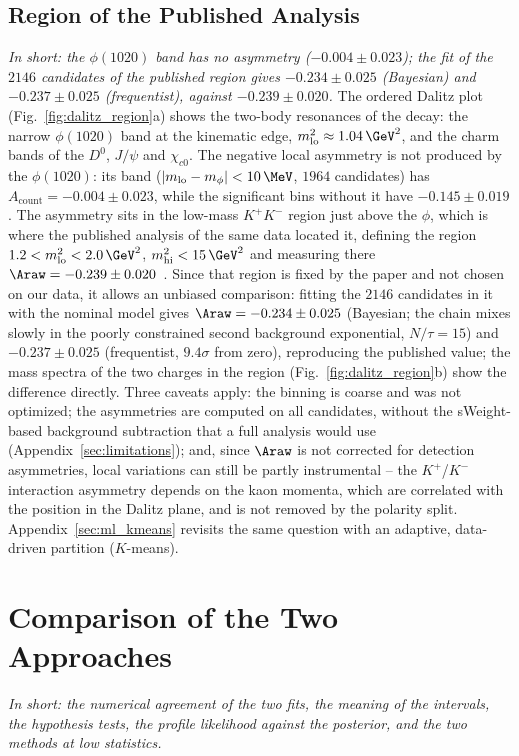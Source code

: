 \subsection{Region of the Published Analysis}
\emph{In short: the $\phi(1020)$ band has no asymmetry ($-0.004\pm0.023$); the fit of the $2146$ candidates of the published region gives $-0.234\pm0.025$ (Bayesian) and $-0.237\pm0.025$ (frequentist), against $-0.239\pm0.020$.}
The ordered Dalitz plot (Fig.~\ref{fig:dalitz_region}a) shows the two-body resonances of the decay: the narrow $\phi(1020)$ band at the kinematic edge, $m^2_{\mathrm{lo}}\approx1.04\,\GeV^2$, and the charm bands of the $D^0$, $J/\psi$ and $\chi_{c0}$. The negative local asymmetry is not produced by the $\phi(1020)$: its band ($|m_{\mathrm{lo}}-m_\phi|<10\,\MeV$, $1964$ candidates) has $A_{\mathrm{count}}=-0.004\pm0.023$, while the significant bins without it have $-0.145\pm0.019$. The asymmetry sits in the low-mass $K^+K^-$ region just above the $\phi$, which is where the published analysis of the same data located it, defining the region $1.2<m^2_{\mathrm{lo}}<2.0\,\GeV^2$, $m^2_{\mathrm{hi}}<15\,\GeV^2$ and measuring there $\Araw=-0.239\pm0.020$~\cite{lhcb_cpv_2013}. Since that region is fixed by the paper and not chosen on our data, it allows an unbiased comparison: fitting the $2146$ candidates in it with the nominal model gives $\Araw=-0.234\pm0.025$ (Bayesian; the chain mixes slowly in the poorly constrained second background exponential, $N/\tau=15$) and $-0.237\pm0.025$ (frequentist, $9.4\sigma$ from zero), reproducing the published value; the mass spectra of the two charges in the region (Fig.~\ref{fig:dalitz_region}b) show the difference directly. Three caveats apply: the binning is coarse and was not optimized; the asymmetries are computed on all candidates, without the sWeight-based background subtraction that a full analysis would use (Appendix~\ref{sec:limitations}); and, since $\Araw$ is not corrected for detection asymmetries, local variations can still be partly instrumental -- the $K^+$/$K^-$ interaction asymmetry depends on the kaon momenta, which are correlated with the position in the Dalitz plane, and is not removed by the polarity split. Appendix~\ref{sec:ml_kmeans} revisits the same question with an adaptive, data-driven partition ($K$-means).

\FloatBarrier

\section{Comparison of the Two Approaches}
\label{app:ext_comp}
\emph{In short: the numerical agreement of the two fits, the meaning of the intervals, the hypothesis tests, the profile likelihood against the posterior, and the two methods at low statistics.}

